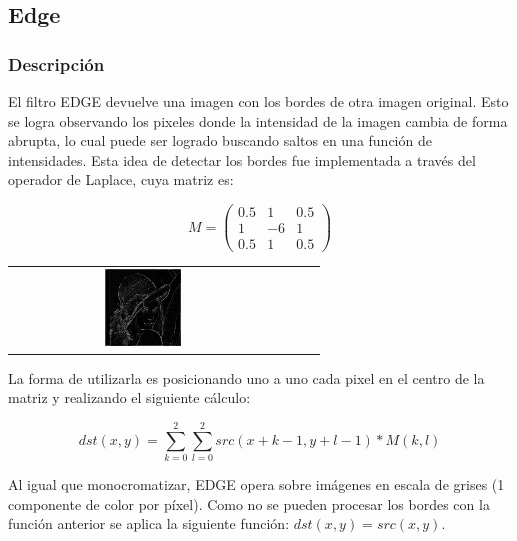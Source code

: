 \subsection{Edge}

\subsubsection{Descripción}

\begin{multicols}{2}
El filtro EDGE devuelve una imagen con los bordes de otra imagen original. Esto se logra observando los pixeles donde la intensidad de la imagen cambia de forma abrupta, lo cual puede ser logrado buscando saltos en una función de intensidades. Esta idea de detectar los bordes fue implementada a través del operador de Laplace, cuya matriz es: 

$$ M = \left(
\begin{matrix}
    0.5 & 1 & 0.5 \\
    1 & -6 & 1 \\
    0.5 & 1 & 0.5
\end{matrix}
\right)$$

\begin{center}
	\begin{tabular}{cccc}
		\includegraphics[width=0.3\textwidth]{imagenes/lenaEDGA.jpg} \\
		\end{tabular}
	\end{center}
\end{multicols}

La forma de utilizarla es posicionando uno a uno cada pixel en el centro de la matriz y realizando el siguiente cálculo: 

$$dst(x, y) = \sum_{k = 0}^2 \sum_{l = 0}^2 src(x + k - 1, y + l - 1) * M(k, l)$$

Al igual que monocromatizar, EDGE opera sobre imágenes en escala de grises (1 componente de color por píxel).
Como no se pueden procesar los bordes con la función anterior se aplica la siguiente función: $dst(x, y) = src(x,y)$.


